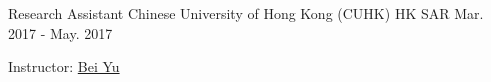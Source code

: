 \begin{cventries}
\cventry
{Research Assistant} %
{Chinese University of Hong Kong (CUHK)} %
{HK SAR} %
{Mar. 2017 - May. 2017} %
{ %
\begin{cvitems}
\item {Instructor: \href{http://www.cse.cuhk.edu.hk/~byu/}{Bei Yu}}
\end{cvitems}
}

\end{cventries}